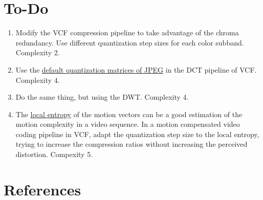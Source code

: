 \section{To-Do}
\begin{enumerate}
\item Modify the VCF compression pipeline to take advantage of the chroma
  redundancy. Use different quantization step sizes for each color
  subband. Complexity 2.
\item Use the
  \href{http://www.jatit.org/volumes/Vol70No3/24Vol70No3.pdf}{default
    quantization matrices of JPEG} in the DCT pipeline of
  VCF. Complexity 4.
\item Do the same thing, but using the DWT. Complexity 4.
\item The
  \href{https://scikit-image.org/docs/stable/auto_examples/filters/plot_entropy.html}{local
    entropy} of the motion vectors can be a good estimation of the
  motion complexity in a video sequence. In a motion compensated video
  coding pipeline in VCF, adapt the quantization step size to the
  local entropy, trying to increase the compression ratios without
  increasing the perceived distortion. Compexity 5.
\end{enumerate}

\section{References}

\renewcommand{\addcontentsline}[3]{}%

